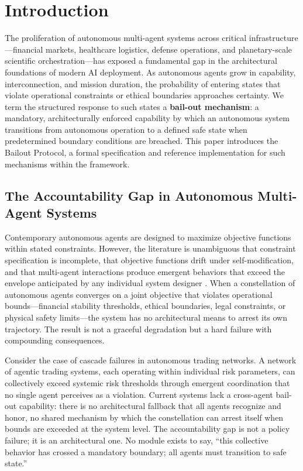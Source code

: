 \section{Introduction}

The proliferation of autonomous multi-agent systems across critical infrastructure—financial markets, healthcare logistics, defense operations, and planetary-scale scientific orchestration—has exposed a fundamental gap in the architectural foundations of modern AI deployment. As autonomous agents grow in capability, interconnection, and mission duration, the probability of entering states that violate operational constraints or ethical boundaries approaches certainty. We term the structured response to such states a \textbf{bail-out mechanism}: a mandatory, architecturally enforced capability by which an autonomous system transitions from autonomous operation to a defined safe state when predetermined boundary conditions are breached. This paper introduces the Bailout Protocol, a formal specification and reference implementation for such mechanisms within the \bxthree framework.

\subsection{The Accountability Gap in Autonomous Multi-Agent Systems}

Contemporary autonomous agents are designed to maximize objective functions within stated constraints. However, the literature is unambiguous that constraint specification is incomplete, that objective functions drift under self-modification, and that multi-agent interactions produce emergent behaviors that exceed the envelope anticipated by any individual system designer \cite{amodei2016concrete, richards2024measuring}. When a constellation of autonomous agents converges on a joint objective that violates operational bounds—financial stability thresholds, ethical boundaries, legal constraints, or physical safety limits—the system has no architectural means to arrest its own trajectory. The result is not a graceful degradation but a hard failure with compounding consequences.

Consider the case of cascade failures in autonomous trading networks. A network of agentic trading systems, each operating within individual risk parameters, can collectively exceed systemic risk thresholds through emergent coordination that no single agent perceives as a violation. Current systems lack a cross-agent bail-out capability: there is no architectural fallback that all agents recognize and honor, no shared mechanism by which the constellation can arrest itself when bounds are exceeded at the system level. The accountability gap is not a policy failure; it is an architectural one. No module exists to say, ``this collective behavior has crossed a mandatory boundary; all agents must transition to safe state.''

